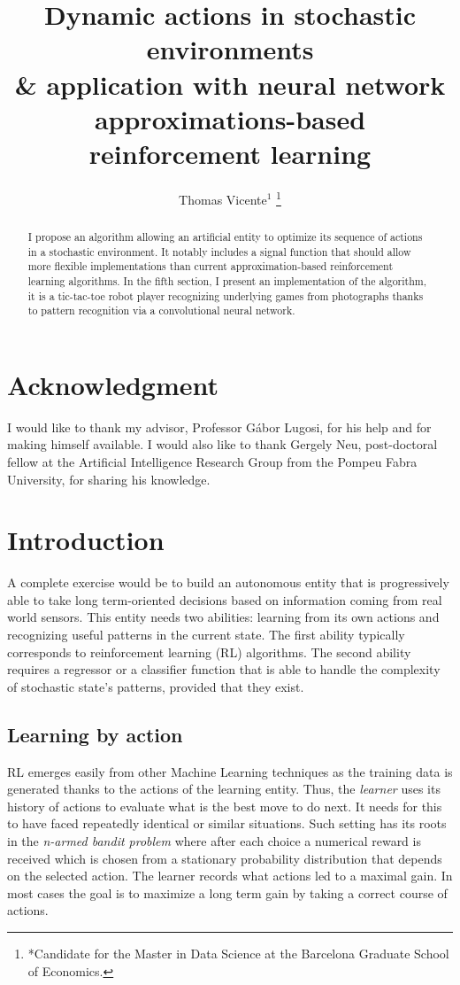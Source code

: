\documentclass[scrartcl, 10.5 pt, conference]{ieeeconf}
\title{\LARGE \bf
Dynamic actions in stochastic environments \\
\large \& application with neural network approximations-based reinforcement learning
}
\author{Thomas Vicente$^{1}$%
\thanks{*Candidate for the Master in Data Science at the Barcelona Graduate School of Economics.}%
}
\begin{document}
\maketitle
\thispagestyle{empty}
\pagestyle{empty}

\begin{abstract}

I propose an algorithm allowing an artificial entity to optimize its sequence of actions in a stochastic environment. It notably includes a signal function that should allow more flexible implementations than current approximation-based reinforcement learning algorithms. In the fifth section, I present an implementation of the algorithm, it is a tic-tac-toe robot player recognizing underlying games from photographs thanks to pattern recognition via a convolutional neural network.

\end{abstract}

\section*{Acknowledgment}

I would like to thank my advisor, Professor Gábor Lugosi, for his help and for making himself available. I would also like to thank Gergely Neu, post-doctoral fellow at the Artificial Intelligence Research Group from the Pompeu Fabra University, for sharing his knowledge.

\section{Introduction}

A complete exercise would be to build an autonomous entity that is progressively able to take long term-oriented decisions based on information coming from real world sensors. This entity needs two abilities: learning from its own actions and recognizing useful patterns in the current state. The first ability typically corresponds to reinforcement learning (RL) algorithms. The second ability requires a regressor or a classifier function that is able to handle the complexity of stochastic state's patterns, provided that they exist. 

\subsection{Learning by action}

RL emerges easily from other Machine Learning techniques as the training data is generated thanks to the actions of the learning entity. Thus, the \textit{learner} uses its history of actions to evaluate what is the best move to do next. It needs for this to have faced repeatedly identical or similar situations. Such setting has its roots in the \textit{n-armed bandit problem} where after each choice a numerical reward is received which is chosen from a stationary probability distribution that depends on the selected action. The learner records what actions led to a maximal gain. In most cases the goal is to maximize a long term gain by taking a correct course of actions. 
\end{document}
